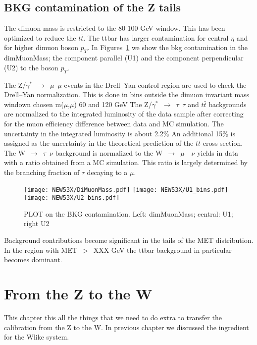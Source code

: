 \documentclass[41pt,a4paper,oneside]{report}
\begin{document}
\section{BKG contamination of the Z tails}
\label{sec:Ztails}
{\color{magenta}{HERE SLIDES:14,15,16}}

The dimuon mass is restricted to the 80-100 GeV window. This has been optimized to reduce the $t\bar{t}$.
The ttbar has larger contamination for central $\eta$ and for higher dimuon boson $p_{T}$.
In Figures~\ref{fig:BKG} we show the bkg contamination in the dimMuonMass; the component parallel (U1) and the component perpendicular (U2) to the boson $p_{T}$.


The Z/$\gamma^{*}$~$\rightarrow$~$\mu$~$\mu$ events in the Drell–Yan control region are used to check the Drell–Yan
normalization. This is done in bins outside the dimuon invariant mass windown chosen m($\mu$,$\mu$) 60 and 120 GeV
The Z/$\gamma^{*}$~$\rightarrow$~$\tau$~$\tau$ and $t\bar{t}$ backgrounds are normalized to the integrated luminosity of the data
sample after correcting for the muon efficiency difference between data and MC simulation.
The uncertainty in the integrated luminosity is about 2.2\%
An additional 15\% is assigned as the uncertainty in the theoretical prediction of the $t\bar{t}$ cross section.
The W~$\rightarrow$~$\tau$~$\nu$ background is normalized to the W~$\rightarrow$~$\mu$~~$\nu$ yields in data with a ratio obtained
from a MC simulation. This ratio is largely determined by the branching fraction of $\tau$ decaying to a $\mu$.

\begin{figure}
  \begin{center}
    \texttt{[image: NEW53X/DiMuonMass.pdf]}
    \texttt{[image: NEW53X/U1\_bins.pdf]}
    \texttt{[image: NEW53X/U2\_bins.pdf]}
    \caption{PLOT on the BKG contamination. Left: dimMuonMass; central: U1; right U2 {\color{blue}{plot oder than OCT6}}}
    \label{fig:BKG}
  \end{center}
\end{figure}


Background contributions become significant in the tails of the MET distribution. In the region with
MET~$>$~XXX GeV the ttbar background in particular becomes dominant.


\chapter{From the Z to the W}
This chapter this all the things that we need to do extra to transfer the calibration from the Z to the W.
In previous chapter we discussed the ingredient for the Wlike system.
\end{document}
